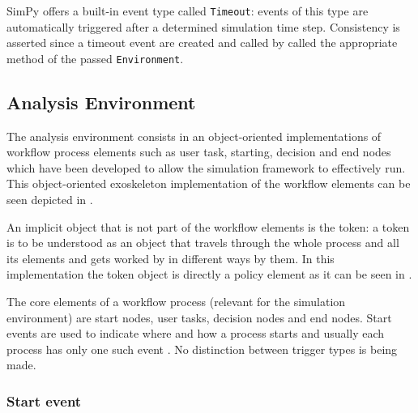 \documentclass{seal_thesis}
\begin{document}
SimPy offers a built-in event type called \texttt{Timeout}: events of this type are automatically triggered after a determined simulation time step. Consistency is asserted since a timeout event are created and called by called the appropriate method of the passed \texttt{Environment}.

\subsection{Analysis Environment}

The analysis environment consists in an object-oriented implementations of workflow process elements such as user task, starting, decision and end nodes which have been developed to allow the simulation framework to effectively run. This object-oriented exoskeleton implementation of the workflow elements can be seen depicted in .


An implicit object that is not part of the workflow elements is the token: a token is to be understood as an object that travels through the whole process and all its elements and gets worked by in different ways by them. In this implementation the token object is directly a policy element as it can be seen in .


The core elements of a workflow process (relevant for the simulation environment) are start nodes, user tasks, decision nodes and end nodes. Start events are used to indicate where and how a process starts and usually each process has only one such event \cite[p. 42]{Silver2009}. No distinction between trigger types is being made.

\subsubsection{Start event}
\end{document}
